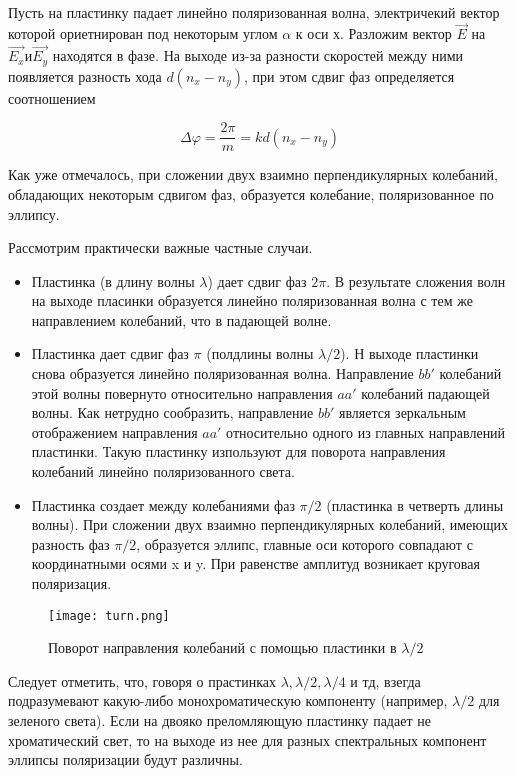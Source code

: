 \documentclass[12pt,a4paper]{article}
\begin{document}
 \

 Пусть на пластинку падает линейно поляризованная волна, электричекий вектор которой ориетнирован под некоторым углом $\alpha$ к оси х.
 Разложим вектор $\vec{E}$  на $\vec{E_x} и \vec{E_y}$ находятся в фазе. На выходе из-за разности скоростей между ними появляется разность хода $d(n_x - n_y)$, при этом сдвиг фаз определяется соотношением 

 \begin{equation}
	 \varDelta\varphi = \frac{2\pi}{m} = kd(n_x - n_y) 
 \end{equation}

 Как уже отмечалось, при сложении двух взаимно перпендикулярных колебаний, обладающих некоторым сдвигом фаз, образуется колебание, поляризованное по эллипсу.

 

 Рассмотрим практически важные частные случаи.
 \begin{itemize}
	 \item Пластинка (в длину волны $\lambda$) дает сдвиг фаз $2\pi$. В результате сложения волн на выходе пласинки образуется линейно поляризованная волна с тем же направлением колебаний, что в падающей волне.
	 \item Пластинка дает сдвиг фаз $\pi$ (полдлины волны $\lambda/2$). Н выходе пластинки снова образуется линейно поляризованная волна. Направление $bb'$ колебаний этой волны повернуто относительно направления $aa'$ колебаний падающей волны. Как нетрудно сообразить, направление $bb'$ является зеркальным отображением направления $aa'$ относительно одного из главных направлений пластинки. Такую пластинку изпользуют для поворота направления колебаний линейно поляризованного света.
	 \item Пластинка создает между колебаниями фаз $\pi/2$ (пластинка в четверть длины волны). При сложении двух взаимно перпендикулярных колебаний, имеющих разность фаз $\pi/2$, образуется эллипс, главные оси которого совпадают с координатными осями x и y. При равенстве амплитуд возникает круговая поляризация.
 \end{itemize} 

 \begin{wrapfigure}[13]{r}{130pt}
	\texttt{[image: turn.png]}
	\caption{Поворот направления колебаний с помощью пластинки в $\lambda/2$}
	\label{p10}
	\end{wrapfigure}

 Следует отметить, что, говоря о прастинках $\lambda, \lambda/2, \lambda/4$ и тд, взегда подразумевают какую-либо монохроматическую компоненту (например, $\lambda/2$ для зеленого света). Если на двояко преломляющую пластинку падает не хроматический свет, то на выходе из нее для разных спектральных компонент эллипсы поляризации будут различны.
 
\end{document}
